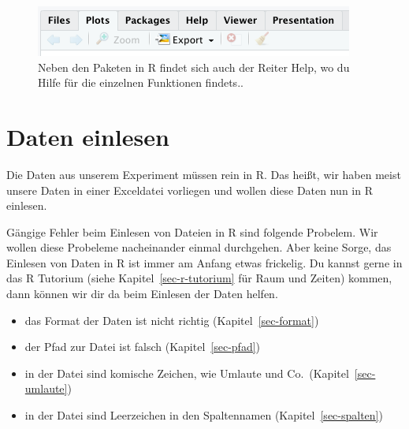 \documentclass[
  letterpaper,
  DIV=11,
  oneside]{scrreport}
\providecommand{\tightlist}{%
  \setlength{\itemsep}{0pt}\setlength{\parskip}{0pt}}\usepackage{longtable,booktabs,array}
\begin{document}
\begin{figure}

{\centering \includegraphics{./images/basics-help.png}

}

\caption{\label{fig-basic-01}Neben den Paketen in R findet sich auch der
Reiter Help, wo du Hilfe für die einzelnen Funktionen findets..}

\end{figure}

\hypertarget{daten-einlesen}{%
\chapter{Daten einlesen}\label{daten-einlesen}}


Die Daten aus unserem Experiment müssen rein in R. Das heißt, wir haben
meist unsere Daten in einer Exceldatei vorliegen und wollen diese Daten
nun in R einlesen.

Gängige Fehler beim Einlesen von Dateien in R sind folgende Probelem.
Wir wollen diese Probeleme nacheinander einmal durchgehen. Aber keine
Sorge, das Einlesen von Daten in R ist immer am Anfang etwas frickelig.
Du kannst gerne in das R Tutorium (siehe Kapitel~\ref{sec-r-tutorium}
für Raum und Zeiten) kommen, dann können wir dir da beim Einlesen der
Daten helfen.

\begin{itemize}
\tightlist
\item
  das Format der Daten ist nicht richtig (Kapitel~\ref{sec-format})
\item
  der Pfad zur Datei ist falsch (Kapitel~\ref{sec-pfad})
\item
  in der Datei sind komische Zeichen, wie Umlaute und
  Co.~(Kapitel~\ref{sec-umlaute})
\item
  in der Datei sind Leerzeichen in den Spaltennamen
  (Kapitel~\ref{sec-spalten})
\end{itemize}
\end{document}
